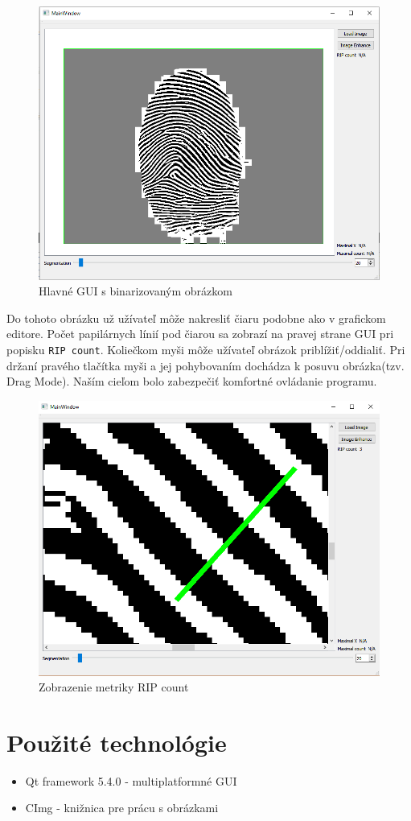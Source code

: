 \documentclass[11pt,a4paper]{article}
\begin{document}
\begin{figure}[h!]
	\centering
	\includegraphics[width=.7\linewidth]{images/Screenshot_15}
	\caption{Hlavné GUI s binarizovaným obrázkom}
	\label{fig:11}
\end{figure}

Do tohoto obrázku už užívateľ môže nakresliť čiaru podobne ako v grafickom editore. Počet papilárnych línií pod čiarou sa zobrazí na pravej strane GUI pri popisku \texttt{RIP count}. Koliečkom myši môže užívateľ obrázok priblížiť/oddialiť. Pri držaní pravého tlačítka myši a jej pohybovaním dochádza k posuvu obrázka(tzv. Drag Mode). Naším cieľom bolo zabezpečiť komfortné ovládanie programu.

\begin{figure}[h!]
	\centering
	\includegraphics[width=.7\linewidth]{images/Screenshot_16}
	\caption{Zobrazenie metriky RIP count}
	\label{fig:11}
\end{figure}

\section*{Použité technológie}
\begin{itemize}
	\item Qt framework 5.4.0 - multiplatformné GUI
	\item CImg - knižnica pre prácu s obrázkami
\end{itemize}
\end{document}
